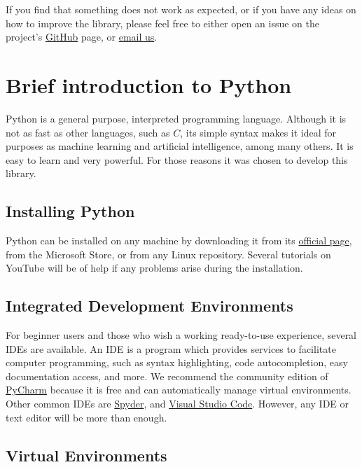 \documentclass[a4paper,12pt]{article}
\begin{document}
If you find that something does not work as expected, or if you have any ideas on how to improve the library, please feel free to either open an issue on the project's \href{https://github.com/JuodaanViinaa/Laboratorio}{GitHub} page, or \href{mailto:maldonadodaniel96@outlook.com}{email us}.

\newpage
\section{Brief introduction to Python}

Python is a general purpose, interpreted programming language. Although it is not as fast as other languages, such as $C$, its simple syntax makes it ideal for purposes as machine learning and artificial intelligence, among many others. It is easy to learn and very powerful. For those reasons it was chosen to develop this library.

\subsection{Installing Python}

Python can be installed on any machine by downloading it from its \href{https://www.python.org/}{official page}, from the Microsoft Store, or from any Linux repository. Several tutorials on YouTube will be of help if any problems arise during the installation.

\subsection{Integrated Development Environments}

For beginner users and those who wish a working ready-to-use experience, several IDEs are available. An IDE is a program which provides services to facilitate computer programming, such as syntax highlighting, code autocompletion, easy documentation access, and more. We recommend the community edition of \href{https://www.jetbrains.com/pycharm/download/}{PyCharm} because it is free and can automatically manage virtual environments. Other common IDEs are \href{https://www.spyder-ide.org/}{Spyder}, and \href{https://code.visualstudio.com/}{Visual Studio Code}. However, any IDE or text editor will be more than enough.

\subsection{Virtual Environments}
\end{document}
